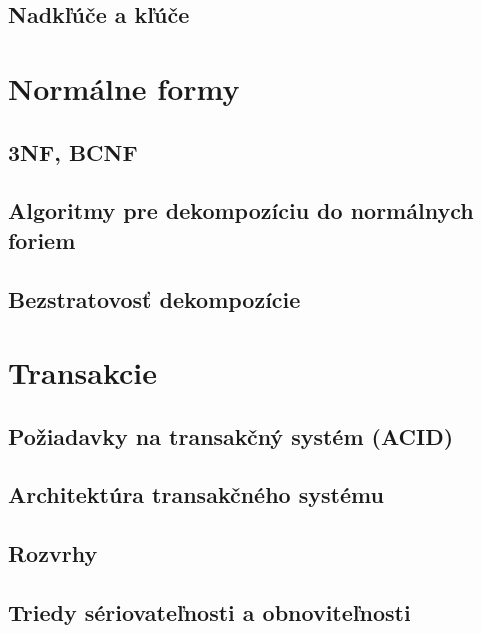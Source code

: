 \documentclass[10pt,a4paper]{article}
\begin{document}
\subsection{Nadkľúče a kľúče}
    
\section{Normálne formy} 
\subsection{3NF, BCNF}
\subsection{Algoritmy pre dekompozíciu do normálnych foriem}
\subsection{Bezstratovosť dekompozície}
    
\section{Transakcie} 
\subsection{Požiadavky na transakčný systém (ACID)}
\subsection{Architektúra transakčného systému}
\subsection{Rozvrhy}
\subsection{Triedy sériovateľnosti a obnoviteľnosti}
    
\end{document}
